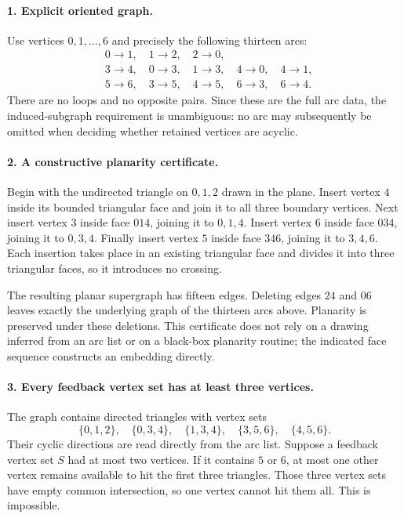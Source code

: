 \documentclass[11pt,a4paper]{article}
\begin{document}
\paragraph{1. Explicit oriented graph.}
Use vertices $0,1,\ldots,6$ and precisely the following thirteen arcs:
\[
\begin{split}
 &0\to1,\quad1\to2,\quad2\to0,\\
 &3\to4,\quad0\to3,\quad1\to3,\quad4\to0,\quad4\to1,\\
 &5\to6,\quad3\to5,\quad4\to5,\quad6\to3,\quad6\to4.
\end{split}
\]
There are no loops and no opposite pairs. Since these are the full
arc data, the induced-subgraph requirement is unambiguous: no arc
may subsequently be omitted when deciding whether retained vertices
are acyclic.

\paragraph{2. A constructive planarity certificate.}
Begin with the undirected triangle on $0,1,2$ drawn in the plane.
Insert vertex $4$ inside its bounded triangular face and join it to
all three boundary vertices. Next insert vertex $3$ inside face
$014$, joining it to $0,1,4$. Insert vertex $6$ inside face $034$,
joining it to $0,3,4$. Finally insert vertex $5$ inside face $346$,
joining it to $3,4,6$. Each insertion takes place in an existing
triangular face and divides it into three triangular faces, so it
introduces no crossing.

The resulting planar supergraph has fifteen edges. Deleting edges
$24$ and $06$ leaves exactly the underlying graph of the thirteen
arcs above. Planarity is preserved under these deletions. This
certificate does not rely on a drawing inferred from an arc list
or on a black-box planarity routine; the indicated face sequence
constructs an embedding directly.

\paragraph{3. Every feedback vertex set has at least three vertices.}
The graph contains directed triangles with vertex sets
\[
 \{0,1,2\},\quad\{0,3,4\},\quad\{1,3,4\},\quad
 \{3,5,6\},\quad\{4,5,6\}.
\]
Their cyclic directions are read directly from the arc list.
Suppose a feedback vertex set $S$ had at most two vertices.
If it contains $5$ or $6$, at most one other vertex remains
available to hit the first three triangles. Those three vertex
sets have empty common intersection, so one vertex cannot hit
them all. This is impossible.
\end{document}
